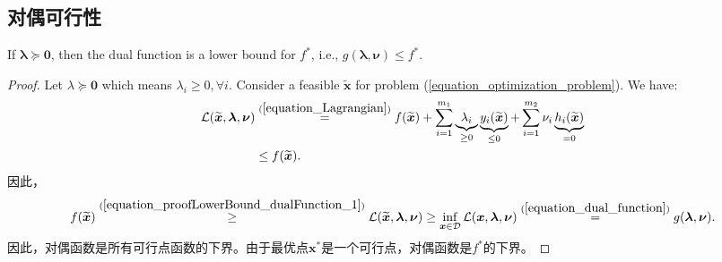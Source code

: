 \documentclass[lang=cn,10pt]{gorgeousnbook}
\numberwithin{equation}{section}%
\numberwithin{figure}{section}%
\begin{document}
\subsection{对偶可行性}
\begin{lemma}[对偶函数为低下界]\label{lemma_dual_function_lower_bound}
If $\boldsymbol{\lambda} \succeq \boldsymbol{0}$, then the dual function is a lower bound for $f^*$, i.e., $g(\boldsymbol{\lambda}, \boldsymbol{\nu}) \leq f^*$. 
\end{lemma}
\begin{proof}
Let $\lambda \succeq \boldsymbol{0}$ which means $\lambda_i \geq 0, \forall i$.
Consider a feasible $\widetilde{\boldsymbol{x}}$ for problem (\ref{equation_optimization_problem}). We have:
\begin{align}
\mathcal{L}(\widetilde{\boldsymbol{x}},\boldsymbol{\lambda},\boldsymbol{\nu}) &\overset{(\ref{equation_Lagrangian})}{=} f(\widetilde{\boldsymbol{x}}) + \sum_{i=1}^{m_1} \underbrace{\lambda_i}_{\geq 0} \underbrace{y_i(\widetilde{\boldsymbol{x}})}_{\leq 0} + \sum_{i=1}^{m_2} \nu_i \underbrace{h_i(\widetilde{\boldsymbol{x}})}_{=0} \nonumber\\
&\leq f(\widetilde{\boldsymbol{x}}). \label{equation_proofLowerBound_dualFunction_1}
\end{align}
因此，
\begin{align*}
f(\widetilde{\boldsymbol{x}}) \overset{(\ref{equation_proofLowerBound_dualFunction_1})}{\geq} \mathcal{L}(\widetilde{\boldsymbol{x}}, \boldsymbol{\lambda}, \boldsymbol{\nu}) \geq \inf_{\boldsymbol{x} \in \mathcal{D}} \mathcal{L}(\boldsymbol{x}, \boldsymbol{\lambda}, \boldsymbol{\nu}) \overset{(\ref{equation_dual_function})}{=} g(\boldsymbol{\lambda}, \boldsymbol{\nu}).
\end{align*}
因此，对偶函数是所有可行点函数的下界。由于最优点$\boldsymbol{x}^*$是一个可行点，对偶函数是$f^*$的下界。
\end{proof}
\end{document}

